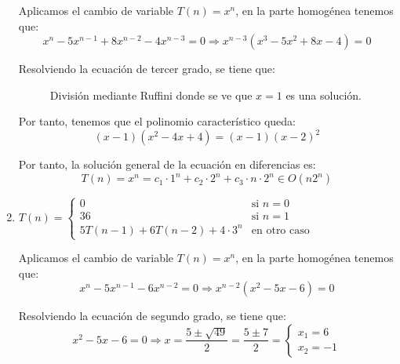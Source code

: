 \begin{ejercicio}
\begin{enumerate}[label=\alph*)]
        Aplicamos el cambio de variable $T(n)=x^n$, en la parte homogénea tenemos que:
        \begin{equation*}
            x^n - 5x^{n-1} + 8x^{n-2} - 4x^{n-3} = 0 \Longrightarrow x^{n-3}(x^3 - 5x^2 + 8x - 4)=0
        \end{equation*}

        Resolviendo la ecuación de tercer grado, se tiene que:
        \begin{figure}[H]
            \centering
            \caption{División mediante Ruffini donde se ve que $x=1$ es una solución.}
        \end{figure}

        Por tanto, tenemos que el polinomio característico queda:
        \begin{equation*}
            (x-1)(x^2-4x+4) = (x-1)(x-2)^2
        \end{equation*}

        Por tanto, la solución general de la ecuación en diferencias es:
        \begin{equation*}
            T(n) = x^n = c_1\cdot 1^n + c_2\cdot 2^n + c_3\cdot n\cdot 2^n \in O(n 2^n)
        \end{equation*}

        \item $T(n) = \begin{cases}
            0 & \text{si } n = 0 \\
            36 & \text{si } n = 1 \\
            5T(n-1) + 6T(n-2) + 4\cdot 3^n & \text{en otro caso}
        \end{cases}$

        Aplicamos el cambio de variable $T(n)=x^n$, en la parte homogénea tenemos que:
        \begin{equation*}
            x^n - 5x^{n-1} - 6x^{n-2} = 0 \Longrightarrow x^{n-2}(x^2 - 5x - 6)=0
        \end{equation*}

        Resolviendo la ecuación de segundo grado, se tiene que:
        \begin{equation*}
            x^2 - 5x - 6 = 0 \Longrightarrow x = \frac{5\pm \sqrt{49}}{2} = \frac{5\pm 7}{2} = \left\{\begin{array}{l}
                x_1 = 6 \\
                x_2 = -1
            \end{array}\right.
        \end{equation*}


\end{enumerate}
\end{ejercicio}

